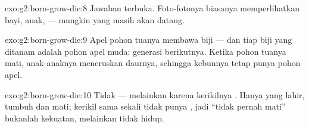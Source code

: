 \begin{solution}{exo:g2:born-grow-die:8}
Jawaban terbuka. Foto-fotonya biasanya memperlihatkan bayi, anak,
 ---  mungkin  yang masih akan datang.
\end{solution}

\begin{solution}{exo:g2:born-grow-die:9}
Apel pohon tuanya membawa biji --- dan tiap biji yang ditanam adalah
pohon apel muda: generasi berikutnya. Ketika pohon tuanya mati,
anak-anaknya meneruskan daurnya, sehingga kebunnya tetap punya pohon
apel.
\end{solution}

\begin{solution}{exo:g2:born-grow-die:10}
Tidak --- melainkan karena kerikilnya . Hanya
 yang lahir, tumbuh dan mati; kerikil sama sekali tidak
punya , jadi ``tidak pernah mati'' bukanlah kekuatan,
melainkan tidak hidup.
\end{solution}
